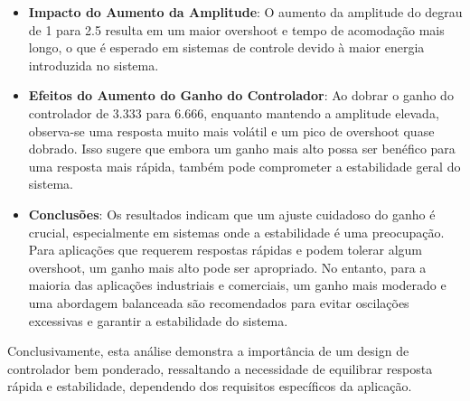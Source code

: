 \begin{itemize}
    \item \textbf{Impacto do Aumento da Amplitude}: O aumento da amplitude do degrau de 1 para 2.5 resulta em um maior overshoot e tempo de acomodação mais longo, o que é esperado em sistemas de controle devido à maior energia introduzida no sistema.

    \item \textbf{Efeitos do Aumento do Ganho do Controlador}: Ao dobrar o ganho do controlador de 3.333 para 6.666, enquanto mantendo a amplitude elevada, observa-se uma resposta muito mais volátil e um pico de overshoot quase dobrado. Isso sugere que embora um ganho mais alto possa ser benéfico para uma resposta mais rápida, também pode comprometer a estabilidade geral do sistema.

    \item \textbf{Conclusões}: Os resultados indicam que um ajuste cuidadoso do ganho é crucial, especialmente em sistemas onde a estabilidade é uma preocupação. Para aplicações que requerem respostas rápidas e podem tolerar algum overshoot, um ganho mais alto pode ser apropriado. No entanto, para a maioria das aplicações industriais e comerciais, um ganho mais moderado e uma abordagem balanceada são recomendados para evitar oscilações excessivas e garantir a estabilidade do sistema.
\end{itemize}

Conclusivamente, esta análise demonstra a importância de um design de controlador bem ponderado, ressaltando a necessidade de equilibrar resposta rápida e estabilidade, dependendo dos requisitos específicos da aplicação.
